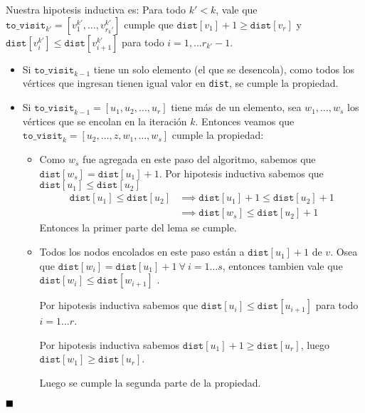 \begin{demoPart}
  Nuestra hipotesis inductiva es: Para todo \(k' < k\), vale que \(\texttt{to\_visit}_{k'} = [v_1^{k'},\dots,v_{r_k'}^{k'}]\) cumple que  \(\texttt{dist}[v_1] + 1 \geq \texttt{dist}[v_r]\) y
  \(\texttt{dist}[v^{k'}_i] \leq \texttt{dist}[v^{k'}_{i+1}]\) para todo \(i = 1,\dots r_{k'}-1\).

  \begin{itemize}
    \item Si \(\texttt{to\_visit}_{k-1}\) tiene un solo elemento (el que se desencola), como todos los vértices que ingresan tienen igual valor en \texttt{dist}, se cumple la propiedad.
    \item Si \(\texttt{to\_visit}_{k-1} = [u_1,u_2,\dots,u_r]\) tiene más de un elemento, sea \(w_1,\dots,w_s\) los vértices que se encolan en la iteración \(k\).
          Entonces veamos que \(\texttt{to\_visit}_k = [u_2,\dots,z,w_1,\dots,w_s]\) cumple la propiedad:
          \begin{itemize}
            \item Como \(w_s\) fue agregada en este paso del algoritmo, sabemos que \(\texttt{dist}[w_s] = \texttt{dist}[u_1] + 1\). Por hipotesis inductiva sabemos que \(\texttt{dist}[u_1] \leq \texttt{dist}[u_2]\)
                  \begin{align*}
                    \texttt{dist}[u_1] \leq \texttt{dist}[u_2] & \implies \texttt{dist}[u_1] + 1\leq \texttt{dist}[u_2] + 1 \\ & \implies \texttt{dist}[w_s] \leq \texttt{dist}[u_2] + 1
                  \end{align*}
                  Entonces la primer parte del lema se cumple.
            \item Todos los nodos encolados en este paso están a \(\texttt{dist}[u_1] + 1\) de \(v\). Osea que \(\texttt{dist}[w_i] = \texttt{dist}[u_1] + 1~\forall~i=1\dots s\), entonces tambien vale que \(\texttt{dist}[w_i] \leq \texttt{dist}[w_{i+1}]\) .

                  Por hipotesis inductiva sabemos que \(\texttt{dist}[u_i] \leq \texttt{dist}[u_{i+1}]\) para todo \(i=1\dots r\).

                  Por hipotesis inductiva sabemos \(\texttt{dist}[u_1]+1 \geq \texttt{dist}[u_r]\), luego \(\texttt{dist}[w_1] \geq \texttt{dist}[u_r]\).

                  Luego se cumple la segunda parte de la propiedad.
          \end{itemize}
  \end{itemize}
  \(\null\hfill\blacksquare\)
\end{demoPart}

